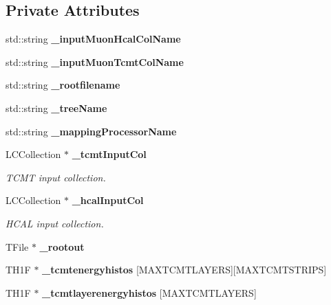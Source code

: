 \subsection*{Private Attributes}
\begin{DoxyCompactItemize}
\item 
std::string {\bfseries \_\-inputMuonHcalColName}\label{classCellAnalysisProcessor_a192ef14533dd5e962c6b58f56393ed76}

\item 
std::string {\bfseries \_\-inputMuonTcmtColName}\label{classCellAnalysisProcessor_ae0e2834703e39e3fa9aab2007d56440e}

\item 
std::string {\bfseries \_\-rootfilename}\label{classCellAnalysisProcessor_a7cdb93f7abacb1ada4ad4ed421493e0b}

\item 
std::string {\bfseries \_\-treeName}\label{classCellAnalysisProcessor_a587be2086799cd234637c08946a7499b}

\item 
std::string {\bfseries \_\-mappingProcessorName}\label{classCellAnalysisProcessor_a913b95ba8bbe5eccf8253928b50a16fe}

\item 
LCCollection $\ast$ {\bf \_\-tcmtInputCol}\label{classCellAnalysisProcessor_aca9af286c2a95ce17648ea2ecefed3ef}

\begin{DoxyCompactList}\small\item\em TCMT input collection. \item\end{DoxyCompactList}\item 
LCCollection $\ast$ {\bf \_\-hcalInputCol}\label{classCellAnalysisProcessor_a2fb10b5b1cc09ca4608868c5658279e7}

\begin{DoxyCompactList}\small\item\em HCAL input collection. \item\end{DoxyCompactList}\item 
TFile $\ast$ {\bfseries \_\-rootout}\label{classCellAnalysisProcessor_a63dad02fbdf1a06166effdd1b09ba0bf}

\item 
TH1F $\ast$ {\bfseries \_\-tcmtenergyhistos} [MAXTCMTLAYERS][MAXTCMTSTRIPS]\label{classCellAnalysisProcessor_a93ffb20f66c77d0d634861972c80433a}

\item 
TH1F $\ast$ {\bfseries \_\-tcmtlayerenergyhistos} [MAXTCMTLAYERS]\label{classCellAnalysisProcessor_a171505082bf368dfe059d7c5ea636ec1}


\end{DoxyCompactItemize}
